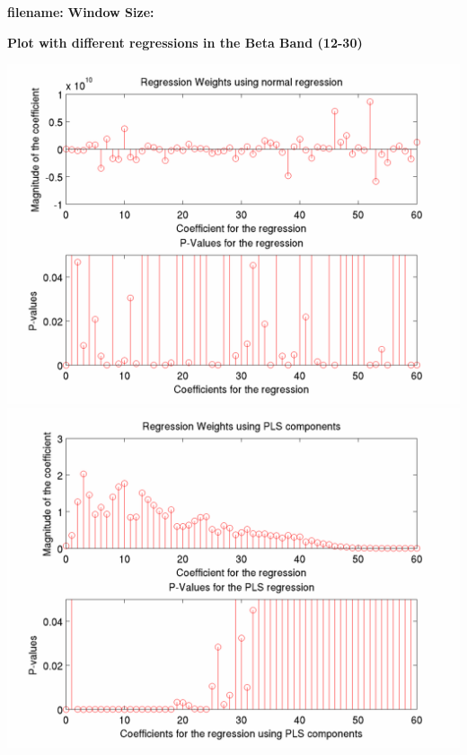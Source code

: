 \documentclass[12pt]{article}
\begin{document}
\begin{center}
\textbf{filename: \expandafter\detokenize\expandafter{\myvar}}
\textbf{Window Size: \expandafter\detokenize\expandafter{\window}}


\textbf{Plot with different regressions in the Beta Band (12-30) }
\end{center}

\includegraphics[scale=0.2]{regression_weights_p_value.png}
\includegraphics[scale=0.2]{glmfit_regression_pls.png}
\end{document}
